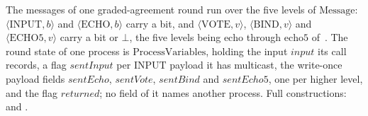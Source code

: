 \begin{definition}
  \label{def:aba-round-messages}
  \leanok
  The messages of one graded-agreement round run over the five levels of $\mathrm{Message}$: $\langle\mathrm{INPUT},b\rangle$ and $\langle\mathrm{ECHO},b\rangle$ carry a bit, and $\langle\mathrm{VOTE},v\rangle$, $\langle\mathrm{BIND},v\rangle$ and $\langle\mathrm{ECHO5},v\rangle$ carry a bit or $\bot$, the five levels being $\mathrm{echo}$ through $\mathrm{echo5}$ of~\cite{ABDY22}.
  The round state of one process is $\mathrm{ProcessVariables}$, holding the input $\mathit{input}$ its call records, a flag $\mathit{sentInput}$ per $\mathrm{INPUT}$ payload it has multicast, the write-once payload fields $\mathit{sentEcho}$, $\mathit{sentVote}$, $\mathit{sentBind}$ and $\mathit{sentEcho5}$, one per higher level, and the flag $\mathit{returned}$; no field of it names another process.
  Full constructions:  and .
\end{definition}
